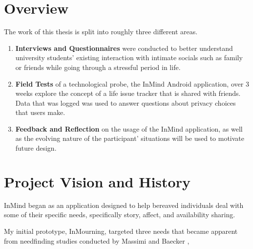 \section{Overview}
  The work of this thesis is split into roughly three different areas.
  \begin{enumerate}
  \item \textbf{Interviews and Questionnaires} were conducted to better understand
    university students' existing interaction with intimate socials
    such as family or friends while going through a stressful period in life.
  \item \textbf{Field Tests} of a technological probe, the InMind Android application,
    over 3 weeks
    explore the concept of a life issue tracker that is shared with friends.
    Data that was logged was used to answer questions about privacy choices that users make.
  \item \textbf{Feedback and Reflection} on the usage of the InMind application,
    as well as the evolving nature of the participant' situations will
    be used to motivate future design.
  \end{enumerate}

\section{Project Vision and History}
\label{sec:vision}
  InMind began as an application designed to help bereaved individuals deal with
  some of their specific needs, specifically story, affect, and availability sharing.

  My initial prototype, InMourning, targeted three needs that became apparent
  from needfinding studies conducted by Massimi and
  Baecker \cite{mm11a, mm10, mm13},

